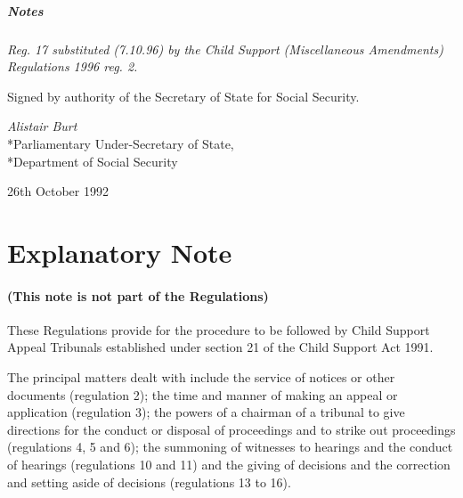 \documentclass[a4paper]{article}
\newcommand{\parthead}{}
\newcommand\amendment[1]{\subsubsection*{Notes}{\itshape\frenchspacing\footnotesize #1 \par}}
\begin{document}
\amendment{
Reg. 17 substituted (7.10.96) by the Child Support (Miscellaneous Amendments) Regulations 1996 reg. 2.
}

\bigskip

Signed by authority of the Secretary of State for Social Security.

{\raggedleft
\emph{Alistair Burt}\\*Parliamentary Under-Secretary of State,\\*Department of Social Security

}

26th October 1992

\part{Explanatory Note}

\renewcommand\parthead{--- Explanatory Note}

\subsection*{(This note is not part of the Regulations)}

 These Regulations provide for the procedure to be followed by Child Support Appeal Tribunals established under section 21 of the Child Support Act 1991.

  The principal matters dealt with include the service of notices or other documents (regulation 2); the time and manner of making an appeal or application (regulation 3); the powers of a chairman of a tribunal to give directions for the conduct or disposal of proceedings and to strike out proceedings (regulations 4, 5 and 6); the summoning of witnesses to hearings and the conduct of hearings (regulations 10 and 11) and the giving of decisions and the correction and setting aside of decisions (regulations 13 to 16).
\end{document}
